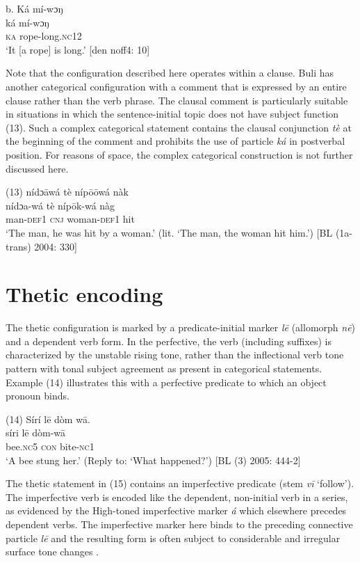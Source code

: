 \documentclass[output=paper]{langsci/langscibook}
\begin{document}
\gll         \textup{ b.}  Ká  mí-wɔŋ\\
\gll \textup{ká  mí-wɔŋ}\\
     \textsc{ka}  rope-long.\textsc{nc}12\\
\glt   ‘It [a rope] is long.’ [den noff4: 10]
\z

Note that the configuration described here operates within a clause. Buli has another categorical configuration with a comment that is expressed by an entire clause rather than the verb phrase. The clausal comment is particularly suitable in situations in which the sentence-initial topic does not have subject function (13). Such a complex categorical statement contains the clausal conjunction \textit{tè} at the beginning of the comment and prohibits the use of particle \textit{ká }in postverbal position.\textit{ }For reasons of space, the complex categorical construction is not further discussed here.

\gll \textup{(13)}  nídɔ\={a}wá  tè  níp\={o}\={o}wá  nàk\\
\gll \textup{  nídɔa-wá  tè  níp\={o}k-wá  nàg}\\
\glt man-\textsc{def}1  \textsc{cnj}  woman-\textsc{def}1  hit\\
‘The man, he was hit by a woman.’ (lit. ‘The man, the woman hit him.’) [BL (1a-trans) 2004: 330] 
\z

\section{Thetic encoding}

The thetic configuration is marked by a predicate-initial marker \textit{l\={e}} (allomorph \textit{n\={e}}) and a dependent verb form. In the perfective, the verb (including suffixes) is characterized by the unstable rising tone, rather than the inflectional verb tone pattern with tonal subject agreement as present in categorical statements. Example (14) illustrates this with a perfective predicate to which an object pronoun binds.

\gll \textup{(14)}  Sírí    l\={e}  dòm  w\={a}.\\
\gll \textup{  síri    l\={e}  dòm-w\={a}}\\
       bee.\textsc{nc}5  \textsc{con}  bite-\textsc{nc}1\\
\glt ‘A bee stung her.’ (Reply to: ‘What happened?’) [BL (3) 2005: 444-2]
\z

The thetic statement in (15) contains an imperfective predicate (stem \textit{v\={i} }‘follow’). The imperfective verb is encoded like the dependent, non-initial verb in a series, as evidenced by the High-toned imperfective marker \textit{á} which elsewhere precedes dependent verbs. The imperfective marker here binds to the preceding connective particle \textit{l\={e} }and the resulting form is often subject to considerable and irregular surface tone changes \citep{Schwarz2007}.
\end{document}
